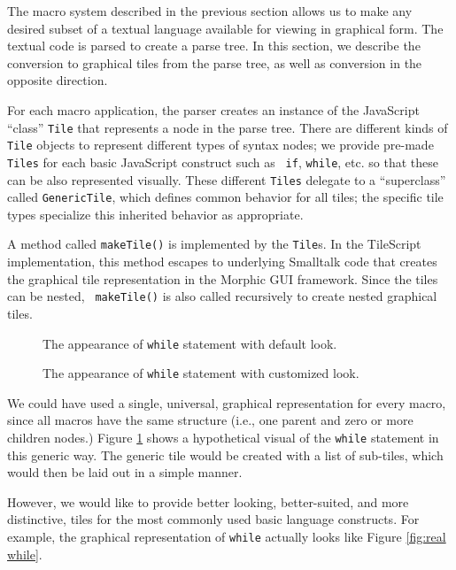 \label{sec:tile implementation}

  The macro system described in the previous section allows us to make any desired subset of a textual
language available for viewing in graphical form.  The textual code is
parsed to create a parse tree.  In this section, we describe the conversion to
graphical tiles from the parse tree, as well as conversion in the opposite direction.

For each macro application, the parser creates an instance of the JavaScript
``class'' {\tt Tile} that represents a node in the parse tree.
There are different kinds of {\tt Tile} objects to represent different
types of syntax nodes; we provide pre-made {\tt Tiles} for each basic JavaScript construct such as {\tt
if}, {\tt while}, etc. so that these
can be also represented visually.  These different {\tt Tiles}
delegate to a ``superclass'' called {\tt GenericTile}, which
defines common behavior for all tiles; the specific tile types 
specialize this inherited behavior as appropriate.

  A method called {\tt makeTile()} is implemented by the {\tt Tile}s.
In the TileScript implementation, this method escapes to underlying
Smalltalk code that creates the graphical tile representation in the
Morphic GUI framework.  Since the tiles can be nested, {\tt
makeTile()} is also called recursively to create nested graphical
tiles.

\begin{figure}[tp]
\centering
{}
\caption{The appearance of {\tt while} statement with default look.}
\label{fig:hypo while}
\end{figure}

\begin{figure}[tp]
\centering
{}
\caption{The appearance of {\tt while} statement with customized look.}
\label{fig:real while}
\end{figure}

  We could have used a single, universal, graphical
representation for every macro, since all macros
have the same structure (i.e., one parent and zero or more children
nodes.)  Figure \ref{fig:hypo while} shows a hypothetical visual of the
{\tt while} statement in this generic way.  The generic tile would be
created with a list of sub-tiles, which would then be laid out in a simple
manner.

  However, we would like to provide better looking, better-suited, and more distinctive, tiles for the
most commonly used basic language constructs.  For example, the graphical
representation of {\tt while} actually looks like Figure \ref{fig:real
while}.  

